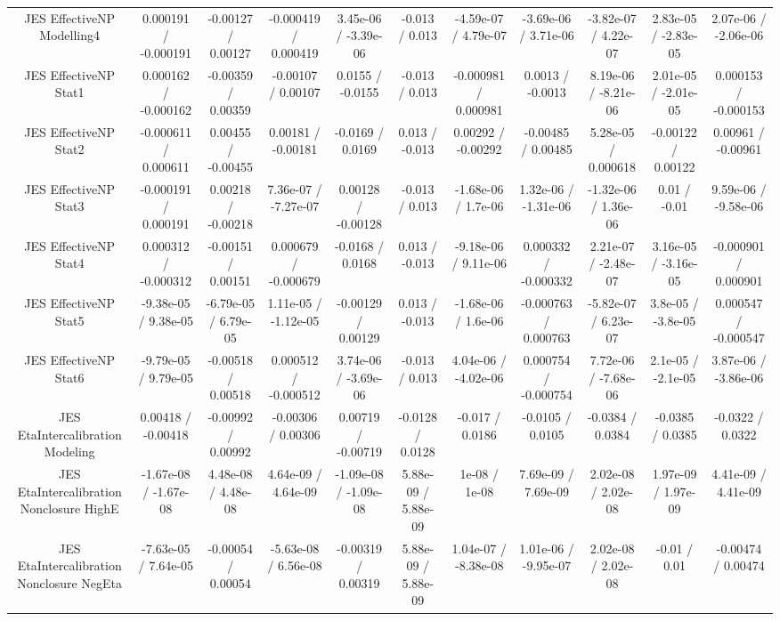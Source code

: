 \begin{table}[htbp]
\begin{center}
\begin{tabular}{|c|c|c|c|c|c|c|c|c|c|c|}
  JES EffectiveNP Modelling4 & 0.000191 / -0.000191 & -0.00127 / 0.00127 & -0.000419 / 0.000419 & 3.45e-06 / -3.39e-06 & -0.013 / 0.013 & -4.59e-07 / 4.79e-07 & -3.69e-06 / 3.71e-06 & -3.82e-07 / 4.22e-07 & 2.83e-05 / -2.83e-05 & 2.07e-06 / -2.06e-06 \\ 
  JES EffectiveNP Stat1 & 0.000162 / -0.000162 & -0.00359 / 0.00359 & -0.00107 / 0.00107 & 0.0155 / -0.0155 & -0.013 / 0.013 & -0.000981 / 0.000981 & 0.0013 / -0.0013 & 8.19e-06 / -8.21e-06 & 2.01e-05 / -2.01e-05 & 0.000153 / -0.000153 \\ 
  JES EffectiveNP Stat2 & -0.000611 / 0.000611 & 0.00455 / -0.00455 & 0.00181 / -0.00181 & -0.0169 / 0.0169 & 0.013 / -0.013 & 0.00292 / -0.00292 & -0.00485 / 0.00485 & 5.28e-05 / 0.000618 & -0.00122 / 0.00122 & 0.00961 / -0.00961 \\ 
  JES EffectiveNP Stat3 & -0.000191 / 0.000191 & 0.00218 / -0.00218 & 7.36e-07 / -7.27e-07 & 0.00128 / -0.00128 & -0.013 / 0.013 & -1.68e-06 / 1.7e-06 & 1.32e-06 / -1.31e-06 & -1.32e-06 / 1.36e-06 & 0.01 / -0.01 & 9.59e-06 / -9.58e-06 \\ 
  JES EffectiveNP Stat4 & 0.000312 / -0.000312 & -0.00151 / 0.00151 & 0.000679 / -0.000679 & -0.0168 / 0.0168 & 0.013 / -0.013 & -9.18e-06 / 9.11e-06 & 0.000332 / -0.000332 & 2.21e-07 / -2.48e-07 & 3.16e-05 / -3.16e-05 & -0.000901 / 0.000901 \\ 
  JES EffectiveNP Stat5 & -9.38e-05 / 9.38e-05 & -6.79e-05 / 6.79e-05 & 1.11e-05 / -1.12e-05 & -0.00129 / 0.00129 & 0.013 / -0.013 & -1.68e-06 / 1.6e-06 & -0.000763 / 0.000763 & -5.82e-07 / 6.23e-07 & 3.8e-05 / -3.8e-05 & 0.000547 / -0.000547 \\ 
  JES EffectiveNP Stat6 & -9.79e-05 / 9.79e-05 & -0.00518 / 0.00518 & 0.000512 / -0.000512 & 3.74e-06 / -3.69e-06 & -0.013 / 0.013 & 4.04e-06 / -4.02e-06 & 0.000754 / -0.000754 & 7.72e-06 / -7.68e-06 & 2.1e-05 / -2.1e-05 & 3.87e-06 / -3.86e-06 \\ 
  JES EtaIntercalibration Modeling & 0.00418 / -0.00418 & -0.00992 / 0.00992 & -0.00306 / 0.00306 & 0.00719 / -0.00719 & -0.0128 / 0.0128 & -0.017 / 0.0186 & -0.0105 / 0.0105 & -0.0384 / 0.0384 & -0.0385 / 0.0385 & -0.0322 / 0.0322 \\ 
  JES EtaIntercalibration Nonclosure HighE & -1.67e-08 / -1.67e-08 & 4.48e-08 / 4.48e-08 & 4.64e-09 / 4.64e-09 & -1.09e-08 / -1.09e-08 & 5.88e-09 / 5.88e-09 & 1e-08 / 1e-08 & 7.69e-09 / 7.69e-09 & 2.02e-08 / 2.02e-08 & 1.97e-09 / 1.97e-09 & 4.41e-09 / 4.41e-09 \\ 
  JES EtaIntercalibration Nonclosure NegEta & -7.63e-05 / 7.64e-05 & -0.00054 / 0.00054 & -5.63e-08 / 6.56e-08 & -0.00319 / 0.00319 & 5.88e-09 / 5.88e-09 & 1.04e-07 / -8.38e-08 & 1.01e-06 / -9.95e-07 & 2.02e-08 / 2.02e-08 & -0.01 / 0.01 & -0.00474 / 0.00474 \\ 

\end{tabular}
\end{center}
\end{table}
